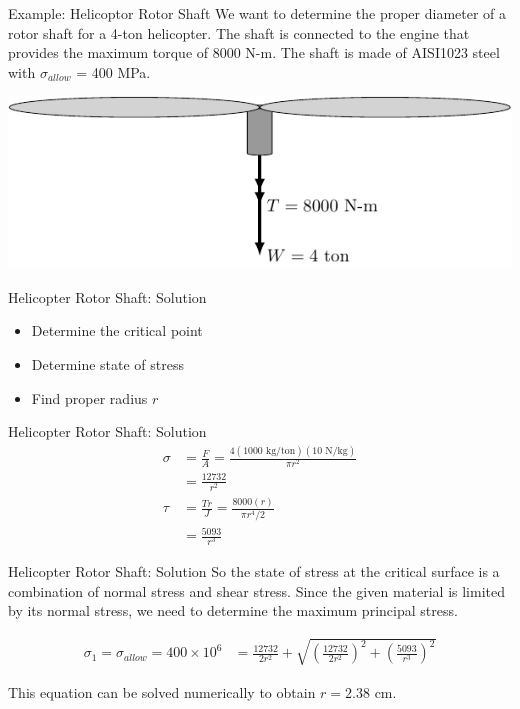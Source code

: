 \documentclass[10pt, svgnames]{beamer}
\begin{document}
\begin{frame}[label={sec:orgea4775b}]{Example: Helicoptor Rotor Shaft}
We want to determine the proper diameter of a rotor shaft for a 4-ton helicopter. The shaft is connected to the engine that provides the maximum torque of 8000 N-m. The shaft is made of AISI1023 steel with \(\sigma_{allow}\) = 400 MPa.

\begin{center}
\includegraphics[width=.9\linewidth]{pictures/helicopter-example.pdf}
\end{center}
\end{frame}

\begin{frame}[label={sec:org3b4f8cd}]{Helicopter Rotor Shaft: Solution}
\begin{itemize}
\item Determine the critical point
\item Determine state of stress
\item Find proper radius \(r\)
\end{itemize}
\end{frame}

\begin{frame}[label={sec:orga4f0cbf}]{Helicopter Rotor Shaft: Solution}
\begin{align*}
  \sigma &= \frac{F}{A} = \frac{4(1000 \text{ kg/ton})(10 \text{ N/kg})}{\pi r^2} \\
         &= \frac{12732}{r^2} \\
  \tau &= \frac{Tr}{J} = \frac{8000(r)}{\pi r^4/2} \\
         &= \frac{5093}{r^3}
\end{align*}
\end{frame}

\begin{frame}[label={sec:orgda9e784}]{Helicopter Rotor Shaft: Solution}
So the state of stress at the critical surface is a combination of normal stress and shear stress. Since the given material is limited by its normal stress, we need to determine the maximum principal stress.

\begin{align*}
\sigma_1 = \sigma_{allow} = 400 \times 10^6 &= \frac{12732}{2r^2} + \sqrt{ \left( \frac{12732}{2r^2} \right)^2 + \left( \frac{5093}{r^3} \right)^2 }
\end{align*}

This equation can be solved numerically to obtain \(r = 2.38\) cm.
\end{frame}
\end{document}
